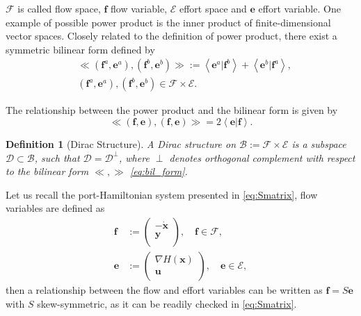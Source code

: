 \documentclass[preprint,12pt]{elsarticle}
\newtheorem{definition}{Definition}
\begin{document}
$\mathcal{F}$ is called flow space, $\bm{f}$ flow variable, $\mathcal{E}$ effort space and $\bm{e}$ effort variable. 
One example of possible power product is the inner product of finite-dimensional vector spaces. Closely related to the definition of power product, there exist a symmetric bilinear form defined by
\begin{equation}
\label{eq:bil_form}
\begin{aligned}
&\ll (\bm{f}^a, \bm{e}^a), (\bm{f}^b, \bm{e}^b) \gg := \left\langle \bm{e}^a \vert \bm{f}^b  \right\rangle+ \left\langle \bm{e}^b \vert \bm{f}^a \right\rangle, \\
&(\bm{f}^a, \bm{e}^a), (\bm{f}^b, \bm{e}^b) \in \mathcal{F} \times \mathcal{E}.
\end{aligned}
\end{equation}

The relationship between the power product and the bilinear form is given by
\begin{equation}
\ll (\bm{f}, \bm{e}), (\bm{f}, \bm{e}) \gg = 2 \left\langle \bm{e} \vert \bm{f} \right\rangle.
\end{equation}

\begin{definition}[Dirac Structure]
A Dirac structure on $\mathcal{B} := \mathcal{F} \times \mathcal{E}$ is a subspace $\mathcal{D} \subset \mathcal{B}$, such that $\mathcal{D} = \mathcal{D}^\perp$, where $\perp$ denotes orthogonal complement with respect to the bilinear form $\ll , \gg$ \eqref{eq:bil_form}.
\end{definition}

Let us recall the port-Hamiltonian system presented in \eqref{eq:Smatrix}, flow variables are defined
as
\begin{align}
\bm{f} &:=
\begin{pmatrix}
-\dot{ \bm{x} }\\
\bm{y} \\
\end{pmatrix}, \quad \bm{f} \in \mathcal{F}, \\
\bm{e} &:=
\begin{pmatrix}
\nabla H(\bm{x})\\
\bm{u} \\
\end{pmatrix}, \quad \bm{e} \in \mathcal{E},
\end{align}
then a relationship between the flow and effort variables can be written as $\bm{f} = S \bm{e}$ with $S$ skew-symmetric, as it can be readily checked in \eqref{eq:Smatrix}.
\end{document}

